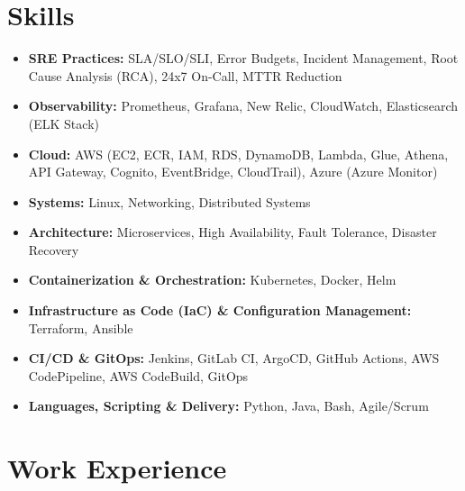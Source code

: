 \documentclass[a4paper,10.999999pt]{article}
\begin{document}
    \section{Skills}
    \begin{itemize}[leftmargin=1.35em, itemsep=0.35pt, topsep=0.3pt, parsep=0pt, label=\raisebox{0.25ex}{\tiny$\circ$}]
    \item \textbf{SRE Practices:} SLA/SLO/SLI, Error Budgets, Incident Management, Root Cause Analysis (RCA), 24x7 On-Call, MTTR Reduction
    \item \textbf{Observability:} Prometheus, Grafana, New Relic, CloudWatch, Elasticsearch (ELK Stack)
    \item \textbf{Cloud:} AWS (EC2, ECR, IAM, RDS, DynamoDB, Lambda, Glue, Athena, API Gateway, Cognito, EventBridge, CloudTrail), Azure (Azure Monitor)
    \item \textbf{Systems:} Linux, Networking, Distributed Systems
    \item \textbf{Architecture:} Microservices, High Availability, Fault Tolerance, Disaster Recovery
    \item \textbf{Containerization \& Orchestration:} Kubernetes, Docker, Helm
    \item \textbf{Infrastructure as Code (IaC) \& Configuration Management:} Terraform, Ansible
    \item \textbf{CI/CD \& GitOps:} Jenkins, GitLab CI, ArgoCD, GitHub Actions, AWS CodePipeline, AWS CodeBuild, GitOps
    \item \textbf{Languages, Scripting \& Delivery:} Python, Java, Bash, Agile/Scrum
    \end{itemize}


    \section{Work Experience}
\end{document}
